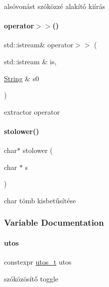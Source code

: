 alsóvonást szóközzé alakító kiírás 

\mbox{\label{schtring_8hpp_aea8ed420ad5e70828bc42b0fb9b49366}} 
\paragraph{\texorpdfstring{operator$>$$>$()}{operator>>()}}
{\footnotesize\ttfamily std\+::istream\& operator$>$$>$ (\begin{DoxyParamCaption}\item[{std\+::istream \&}]{is,  }\item[{\mbox{\hyperlink{class_string}{String}} \&}]{s0 }\end{DoxyParamCaption})}



extractor operator 

\mbox{\label{schtring_8hpp_a9d7d0d0ea2b8f0f7c6d53fe66fc0b301}} 
\paragraph{\texorpdfstring{stolower()}{stolower()}}
{\footnotesize\ttfamily char$\ast$ stolower (\begin{DoxyParamCaption}\item[{char $\ast$}]{s }\end{DoxyParamCaption})}



char tömb kisbetűsítése 



\subsubsection{Variable Documentation}
\mbox{\label{schtring_8hpp_a87ab25645bb130a0e89654a4ba9d2bce}} 
\paragraph{\texorpdfstring{utos}{utos}}
{\footnotesize\ttfamily constexpr \mbox{\hyperlink{structutos__t}{utos\+\_\+t}} utos}



szóközösítő toggle 

